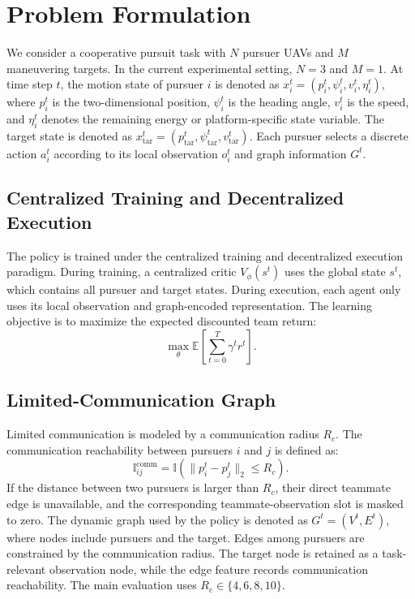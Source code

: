 \section{Problem Formulation}

We consider a cooperative pursuit task with $N$ pursuer UAVs and $M$ maneuvering targets. In the current experimental setting, $N=3$ and $M=1$. At time step $t$, the motion state of pursuer $i$ is denoted as $x_i^t=(p_i^t,\psi_i^t,v_i^t,\eta_i^t)$, where $p_i^t$ is the two-dimensional position, $\psi_i^t$ is the heading angle, $v_i^t$ is the speed, and $\eta_i^t$ denotes the remaining energy or platform-specific state variable. The target state is denoted as $x_{\mathrm{tar}}^t=(p_{\mathrm{tar}}^t,\psi_{\mathrm{tar}}^t,v_{\mathrm{tar}}^t)$. Each pursuer selects a discrete action $a_i^t$ according to its local observation $o_i^t$ and graph information $G^t$.

\subsection{Centralized Training and Decentralized Execution}

The policy is trained under the centralized training and decentralized execution paradigm. During training, a centralized critic $V_\phi(s^t)$ uses the global state $s^t$, which contains all pursuer and target states. During execution, each agent only uses its local observation and graph-encoded representation. The learning objective is to maximize the expected discounted team return:
\begin{equation}
\max_\theta \mathbb{E}\left[\sum_{t=0}^{T}\gamma^t r^t\right].
\end{equation}

\subsection{Limited-Communication Graph}

Limited communication is modeled by a communication radius $R_c$. The communication reachability between pursuers $i$ and $j$ is defined as:
\begin{equation}
\mathbb{I}_{ij}^{\mathrm{comm}}=\mathbb{I}\left(\|p_i^t-p_j^t\|_2\leq R_c\right).
\end{equation}
If the distance between two pursuers is larger than $R_c$, their direct teammate edge is unavailable, and the corresponding teammate-observation slot is masked to zero. The dynamic graph used by the policy is denoted as $G^t=(V^t,E^t)$, where nodes include pursuers and the target. Edges among pursuers are constrained by the communication radius. The target node is retained as a task-relevant observation node, while the edge feature records communication reachability. The main evaluation uses $R_c\in\{4,6,8,10\}$.

